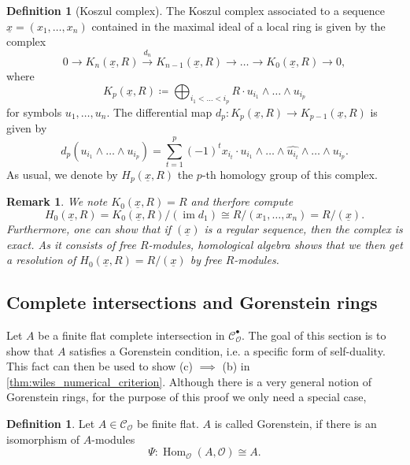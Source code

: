\documentclass{article}
\theoremstyle{plain}%
\newtheorem{remark}[theorem]{Remark}
\theoremstyle{definition}
\newtheorem{definition}[theorem]{Definition}
\theoremstyle{remark}
\newcommand{\cob}{\mathcal{C}_\mathcal{O}^\bullet}
\newcommand{\co}{\mathcal{C}_\mathcal{O}}
\newcommand{\im}{\operatorname{im}}
\renewcommand{\hom}{\operatorname{Hom}}
\begin{document}
\begin{definition}[Koszul complex]\cites[ch. 5.3]{Darmon1995}[\S 16]{Matsumura1986}
    The Koszul complex associated to a sequence \(\underline{x} = (x_1, \dots, x_n)\) contained in the maximal ideal
    of a local ring is given by the complex
    \[
        0 \to K_n(\underline{x}, R) \xrightarrow{d_n} K_{n-1}(\underline{x}, R) \to \dots \to K_{0}(\underline{x},R) \to 0,
    \]
    where 
    \[
        K_p(\underline{x}, R) \coloneqq \bigoplus_{i_1 < \dots < i_p} R \cdot u_{i_1}\wedge\dots\wedge u_{i_p}
    \]
    for symbols \(u_1, \dots, u_n\). The differential map \(d_p\colon K_p(\underline{x}, R) \to K_{p-1}(\underline{x}, R)\)
    is given by
    \[
        d_p(u_{i_1}\wedge\dots\wedge u_{i_p}) = \sum_{t=1}^p(-1)^t x_{i_t} \cdot 
        u_{i_1} \wedge \dots \wedge \widehat{u_{i_t}}\wedge \dots \wedge u_{i_p}.
    \]
    As usual, we denote by \(H_p(\underline{x}, R)\) the \(p\)-th homology group of this complex.
\end{definition}

\begin{remark}\textup{\cites[proposition 5.13]{Darmon1995}[theorem 16.5 (i)]{Matsumura1986}}
    We note \(K_0(\underline{x}, R) = R\) and therfore compute
    \[
        H_0(\underline{x}, R) = K_0(\underline{x}, R)/(\im d_1) \cong R/(x_1, \dots, x_n) = R/(\underline{x}).
    \]
    Furthermore, one can show that if \((\underline{x})\) is a regular sequence, then the complex is exact.
    As it consists of free \(R\)-modules, homological algebra shows that we then get a resolution of
    \(H_0(\underline{x}, R) = R/(\underline{x})\) by free \(R\)-modules. 
\end{remark}

\subsection{Complete intersections and Gorenstein rings}
Let \(A\) be a finite flat complete intersection in \(\cob\). The goal of this section is to show that \(A\)
satisfies a Gorenstein condition, i.e. a specific form of self-duality.
This fact can then be used to show (c) \(\implies\) (b) in \cref{thm:wiles_numerical_criterion}.
Although there is a very general notion of Gorenstein rings, for
the purpose of this proof we only need a special case,
\begin{definition}
    Let \(A \in \co\) be finite flat. \(A\) is called Gorenstein, if there is an isomorphism of \(A\)-modules
    \[
        \Psi\colon \hom_\mathcal{O}(A, \mathcal{O}) \cong A.
    \]
\end{definition}
\end{document}
